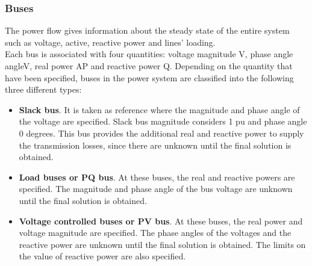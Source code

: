 \subsubsection{Buses}
The power flow gives information about the steady state of the entire system such as voltage, active, reactive power and lines' loading.\\
Each bus is associated with four quantities: voltage magnitude \gls{V}, phase angle \gls{angleV}, real power \gls{AP} and reactive power \gls{Q}.
Depending on the quantity that have been specified, buses in the power system are classified into the following three different types:
\begin{itemize}
    \item \textbf{Slack bus}. It is taken as reference where the magnitude and phase angle of the voltage are specified. Slack bus magnitude considers 1 \gls{pu} and phase angle 0 degrees. This bus provides the additional real and reactive power to supply the transmission losses, since there are unknown until the final solution is obtained.

    \item \textbf{Load buses or PQ bus}. At these buses, the real and reactive powers are specified. The magnitude and phase angle of the bus voltage are unknown until the final solution is obtained.

    \item \textbf{Voltage controlled buses or PV bus}. At these buses, the real power and voltage magnitude are specified. The phase angles of the voltages and the reactive power are unknown until the final solution is obtained. The limits on the value of reactive power are also specified. 
\end{itemize}

